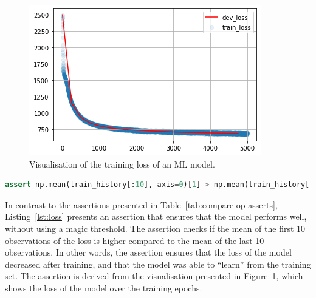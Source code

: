 \documentclass[conference]{IEEEtran}
\begin{document}
\begin{figure}
  \includegraphics[width=\linewidth]{../catalogue/select-16.png}
  \caption{Visualisation of the training loss of an ML model.}\label{fig:loss}
\end{figure}

\begin{lstlisting}[language=Python, caption={Assertion to check that the mean of the first 10 observations of the loss is higher than the mean of the last 10 observations. In other words, the assertion checks if the loss function is converging to an optimal minima.}, label={lst:loss}]
assert np.mean(train_history[:10], axis=0)[1] > np.mean(train_history[-10:], axis=0)[1], "The model didn't converge."
\end{lstlisting}

In contrast to the assertions presented in Table~\ref{tab:compare-op-asserts}, Listing~\ref{lst:loss} presents an assertion that ensures that the model performs well, without using a magic threshold. The assertion checks if the mean of the first 10 observations of the loss is higher compared to the mean of the last 10 observations. In other words, the assertion ensures that the loss of the model decreased after training, and that the model was able to ``learn'' from the training set. The assertion is derived from the visualisation presented in Figure~\ref{fig:loss}, which shows the loss of the model over the training epochs.
\end{document}
